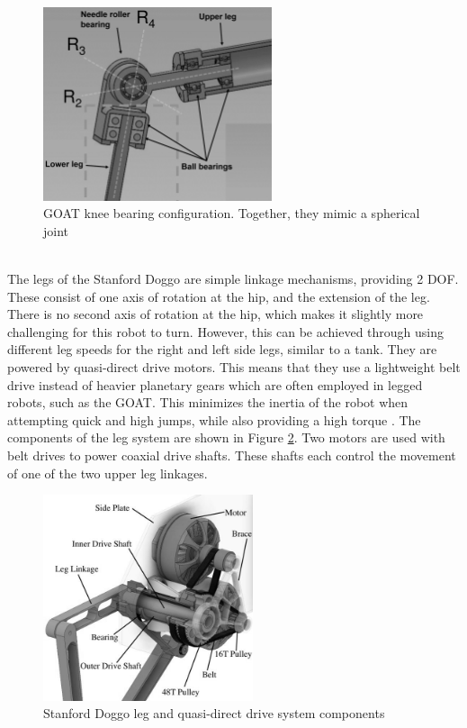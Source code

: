 \begin{figure}[H]
    \centering
    \includegraphics[width=0.6\textwidth]{Sections/LiteratureReview/img/goat/subsys_goat_knee.png}
    \caption{GOAT knee bearing configuration. Together, they mimic a spherical joint \cite{kalouche_design_2016}}
    \label{fig:goat_knee}
\end{figure}

 \mbox{}\\
The legs of the Stanford Doggo are simple linkage mechanisms, providing 2 DOF. These consist of one axis of rotation at the hip, and the extension of the leg. There is no second axis of rotation at the hip, which makes it slightly more challenging for this robot to turn. However, this can be achieved through using different leg speeds for the right and left side legs, similar to a tank. They are powered by quasi-direct drive motors. This means that they use a lightweight belt drive instead of heavier planetary gears which are often employed in legged robots, such as the GOAT. This minimizes the inertia of the robot when attempting quick and high jumps, while also providing a high torque \cite{kau_stanford_2019}. The components of the leg system are shown in Figure \ref{fig:doggo_leg}. Two motors are used with belt drives to power coaxial drive shafts. These shafts each control the movement of one of the two upper leg linkages.

\begin{figure}[h]
    \centering
    \includegraphics[width=0.55\textwidth]{Sections/LiteratureReview/img/doggo/subsys_doggo.JPG}
    \caption{Stanford Doggo leg and quasi-direct drive system components \cite{kau_stanford_2019}}
    \label{fig:doggo_leg}
\end{figure}

